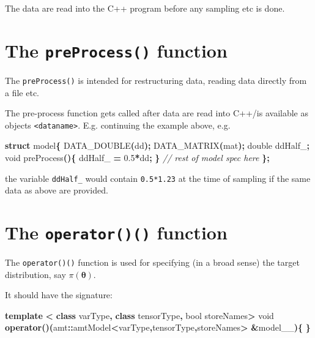 \documentclass[
]{book}
\newenvironment{Shaded}{\begin{snugshade}}{\end{snugshade}}
\newcommand{\CommentTok}[1]{\textcolor[rgb]{0.56,0.35,0.01}{\textit{#1}}}
\newcommand{\DataTypeTok}[1]{\textcolor[rgb]{0.13,0.29,0.53}{#1}}
\newcommand{\FloatTok}[1]{\textcolor[rgb]{0.00,0.00,0.81}{#1}}
\newcommand{\KeywordTok}[1]{\textcolor[rgb]{0.13,0.29,0.53}{\textbf{#1}}}
\newcommand{\NormalTok}[1]{#1}
\newcommand{\OperatorTok}[1]{\textcolor[rgb]{0.81,0.36,0.00}{\textbf{#1}}}
\newcommand{\VariableTok}[1]{\textcolor[rgb]{0.00,0.00,0.00}{#1}}
\begin{document}
The data are read into the C++ program before any sampling etc is done.

\hypertarget{the-preprocess-function}{%
\section{\texorpdfstring{The \texttt{preProcess()} function}{The preProcess() function}}\label{the-preprocess-function}}

The \texttt{preProcess()} is intended for restructuring data, reading data directly from a file etc.

The pre-process function gets called after data are read into C++/is available as objects \texttt{\textless{}dataname\textgreater{}}. E.g. continuing the example above, e.g.

\begin{Shaded}
\begin{Highlighting}[]
\KeywordTok{struct}\NormalTok{ model}\OperatorTok{\{}
\NormalTok{  DATA\_DOUBLE}\OperatorTok{(}\NormalTok{dd}\OperatorTok{);}
\NormalTok{  DATA\_MATRIX}\OperatorTok{(}\NormalTok{mat}\OperatorTok{);}
  \DataTypeTok{double} \VariableTok{ddHalf\_}\OperatorTok{;}
  \DataTypeTok{void}\NormalTok{ preProcess}\OperatorTok{()\{}
    \VariableTok{ddHalf\_} \OperatorTok{=} \FloatTok{0.5}\OperatorTok{*}\NormalTok{dd}\OperatorTok{;}
  \OperatorTok{\}}
  \CommentTok{// rest of model spec here}
\OperatorTok{\};}
\end{Highlighting}
\end{Shaded}

the variable \texttt{ddHalf\_} would contain \texttt{0.5*1.23} at the time of sampling if the same data as above are provided.

\hypertarget{the-operator-function}{%
\section{\texorpdfstring{The \texttt{operator()()} function}{The operator()() function}}\label{the-operator-function}}

The \texttt{operator()()} function is used for specifying (in a broad sense) the target distribution, say \(\pi(\boldsymbol \theta)\).

It should have the signature:

\begin{Shaded}
\begin{Highlighting}[]
\KeywordTok{template} \OperatorTok{\textless{}} \KeywordTok{class}\NormalTok{ varType}\OperatorTok{,} \KeywordTok{class}\NormalTok{ tensorType}\OperatorTok{,} \DataTypeTok{bool}\NormalTok{ storeNames}\OperatorTok{\textgreater{}}
  \DataTypeTok{void} \KeywordTok{operator}\OperatorTok{()(}\NormalTok{amt}\OperatorTok{::}\NormalTok{amtModel}\OperatorTok{\textless{}}\NormalTok{varType}\OperatorTok{,}\NormalTok{tensorType}\OperatorTok{,}\NormalTok{storeNames}\OperatorTok{\textgreater{}} \OperatorTok{\&}\NormalTok{model\_\_}\OperatorTok{)\{}
  \OperatorTok{\}}
\end{Highlighting}
\end{Shaded}
\end{document}
